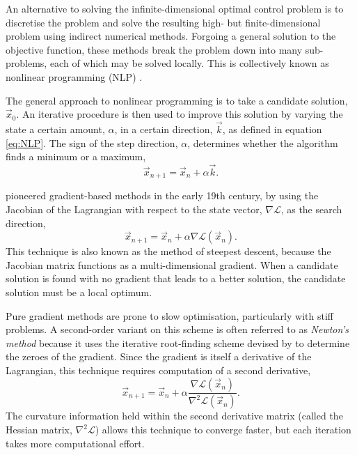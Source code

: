 An alternative to solving the infinite-dimensional optimal control problem is to discretise the problem and solve the resulting high- but finite-dimensional problem using indirect numerical methods. Forgoing a general solution to the objective function, these methods break the problem down into many sub-problems, each of which may be solved locally. This is collectively known as nonlinear programming (NLP) \parencite{Betts1998}. 

The general approach to nonlinear programming is to take a candidate solution, $\vec{x}_0$. An iterative procedure is then used to improve this solution by varying the state a certain amount, $\alpha$, in a certain direction, $\vec{k}$, as defined in equation \eqref{eq:NLP}. The sign of the step direction, $\alpha$, determines whether the algorithm finds a minimum or a maximum,
\begin{equation} \label{eq:NLP}
\vec{x}_{n+1}=\vec{x}_n+\alpha\vec{k}.
\end{equation}

\textcite{Gauss1827} pioneered gradient-based methods in the early 19th century, by using the Jacobian of the Lagrangian with respect to the state vector, $\nabla\mathcal{L}$, as the search direction,
\begin{equation} \label{eq:gradient-method}
\vec{x}_{n+1}=\vec{x}_n + \alpha\nabla\mathcal{L}(\vec{x}_n).
\end{equation}
This technique is also known as the method of steepest descent, because the Jacobian matrix functions as a multi-dimensional gradient. When a candidate solution is found with no gradient that leads to a better solution, the candidate solution must be a local optimum.

Pure gradient methods are prone to slow optimisation, particularly with stiff problems. %
A second-order variant on this scheme is often referred to as \emph{Newton's method} because it uses the iterative root-finding scheme devised by \textcite{Newton1711, Newton1736} to determine the zeroes of the gradient. Since the gradient is itself a derivative of the Lagrangian, this technique requires computation of a second derivative, 
\begin{equation} \label{eq:newtons-method}
\vec{x}_{n+1}=\vec{x}_n + \alpha\frac{\nabla\mathcal{L}(\vec{x}_n)}{\nabla^2\mathcal{L}(\vec{x}_n)}.
\end{equation}
The curvature information held within the second derivative matrix (called the Hessian matrix, $\nabla^2\mathcal{L}$) allows this technique to converge faster, but each iteration takes more computational effort.

